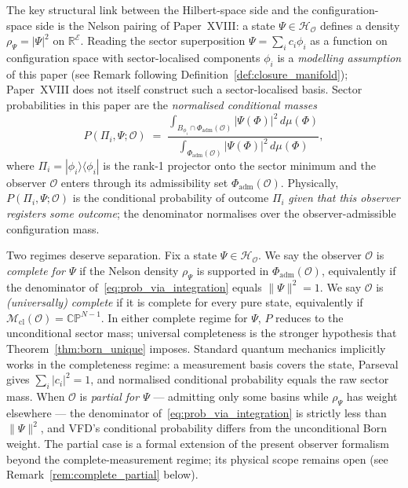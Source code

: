\documentclass[12pt]{article}
\newcommand{\Ecal}{\mathcal{E}}
\newcommand{\Ocal}{\mathcal{O}}
\newcommand{\Hcal}{\mathcal{H}}
\newcommand{\Mcl}{\mathcal{M}_{\mathrm{cl}}}
\begin{document}
The key structural link between the Hilbert-space side and the configuration-space side is the Nelson pairing of Paper~XVIII: a state $\Psi \in \Hcal_\Ocal$ defines a density $\rho_\Psi = |\Psi|^2$ on $\mathbb{R}^\Ecal$. Reading the sector superposition $\Psi = \sum_i c_i \phi_i$ as a function on configuration space with sector-localised components $\phi_i$ is a \emph{modelling assumption} of this paper (see Remark following Definition~\ref{def:closure_manifold}); Paper~XVIII does not itself construct such a sector-localised basis. Sector probabilities in this paper are the \emph{normalised conditional masses}
\begin{equation}\label{eq:prob_via_integration}
    P(\Pi_i, \Psi; \Ocal) \;=\; \frac{\int_{B_{\phi_i} \cap \Phi_{\mathrm{adm}}(\Ocal)} |\Psi(\Phi)|^2\, d\mu(\Phi)}{\int_{\Phi_{\mathrm{adm}}(\Ocal)} |\Psi(\Phi)|^2\, d\mu(\Phi)},
\end{equation}
where $\Pi_i = |\phi_i\rangle\langle\phi_i|$ is the rank-1 projector onto the sector minimum and the observer $\Ocal$ enters through its admissibility set $\Phi_{\mathrm{adm}}(\Ocal)$. Physically, $P(\Pi_i, \Psi; \Ocal)$ is the conditional probability of outcome $\Pi_i$ \emph{given that this observer registers some outcome}; the denominator normalises over the observer-admissible configuration mass.

Two regimes deserve separation. Fix a state $\Psi \in \Hcal_\Ocal$. We say the observer $\Ocal$ is \emph{complete for $\Psi$} if the Nelson density $\rho_\Psi$ is supported in $\Phi_{\mathrm{adm}}(\Ocal)$, equivalently if the denominator of~\eqref{eq:prob_via_integration} equals $\|\Psi\|^2 = 1$. We say $\Ocal$ is \emph{(universally) complete} if it is complete for every pure state, equivalently if $\Mcl(\Ocal) = \mathbb{CP}^{N-1}$. In either complete regime for $\Psi$, $P$ reduces to the unconditional sector mass; universal completeness is the stronger hypothesis that Theorem~\ref{thm:born_unique} imposes. Standard quantum mechanics implicitly works in the completeness regime: a measurement basis covers the state, Parseval gives $\sum_i |c_i|^2 = 1$, and normalised conditional probability equals the raw sector mass. When $\Ocal$ is \emph{partial for $\Psi$} --- admitting only some basins while $\rho_\Psi$ has weight elsewhere --- the denominator of~\eqref{eq:prob_via_integration} is strictly less than $\|\Psi\|^2$, and VFD's conditional probability differs from the unconditional Born weight. The partial case is a formal extension of the present observer formalism beyond the complete-measurement regime; its physical scope remains open (see Remark~\ref{rem:complete_partial} below).
\end{document}
